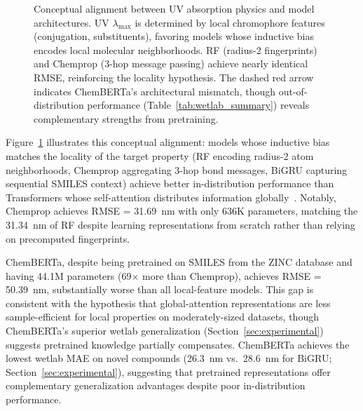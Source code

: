 \documentclass[11pt,a4paper]{article}
\begin{document}
\begin{figure}[htbp]
    \caption{Conceptual alignment between UV absorption physics and model architectures. UV $\lambda_{\max}$ is determined by local chromophore features (conjugation, substituents), favoring models whose inductive bias encodes local molecular neighborhoods. RF (radius-2 fingerprints) and Chemprop (3-hop message passing) achieve nearly identical RMSE, reinforcing the locality hypothesis. The dashed red arrow indicates ChemBERTa's architectural mismatch, though out-of-distribution performance (Table~\ref{tab:wetlab_summary}) reveals complementary strengths from pretraining.}
    \label{fig:local_vs_global}
\end{figure}

Figure~\ref{fig:local_vs_global} illustrates this conceptual alignment: models whose inductive bias matches the locality of the target property (RF encoding radius-2 atom neighborhoods, Chemprop aggregating 3-hop bond messages, BiGRU capturing sequential SMILES context) achieve better in-distribution performance than Transformers whose self-attention distributes information globally~\cite{chenMolecularLanguage2023, jiang2023trangru}.
Notably, Chemprop achieves RMSE = 31.69~nm with only 636K parameters, matching the 31.34~nm of RF despite learning representations from scratch rather than relying on precomputed fingerprints.

ChemBERTa, despite being pretrained on SMILES from the ZINC database and having 44.1M parameters (69$\times$ more than Chemprop), achieves RMSE = 50.39~nm, substantially worse than all local-feature models.
This gap is consistent with the hypothesis that global-attention representations are less sample-efficient for local properties on moderately-sized datasets, though ChemBERTa's superior wetlab generalization (Section~\ref{sec:experimental}) suggests pretrained knowledge partially compensates.
ChemBERTa achieves the lowest wetlab MAE on novel compounds (26.3~nm vs.\ 28.6~nm for BiGRU; Section~\ref{sec:experimental}), suggesting that pretrained representations offer complementary generalization advantages despite poor in-distribution performance.
\end{document}
